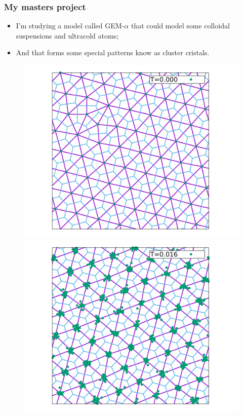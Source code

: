 \documentclass{beamer}
\begin{document}
\begin{frame}
  \frametitle{My masters project}
  \begin{itemize}
  \item I'm studying a model called GEM-$\alpha$ that could model some colloidal suspensions and ultracold atoms;
  \item And that forms some special patterns know as cluster cristals.
  \end{itemize}
  \begin{figure}
    \includegraphics[scale=0.17]{Imagens/T0000.pdf}
    \includegraphics[scale=0.17]{Imagens/T0016.pdf}

\end{figure}
\end{frame}
\end{document}
